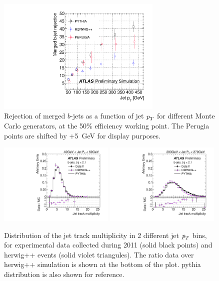 \begin{figure}[tp]
\centering
\includegraphics[width=0.7\textwidth]{gbbRejection_vs_PT_3MonteCarlos_50Eff_shift5.pdf}
\caption{Rejection of merged $b$-jets as a function of jet ${\emph{p}_{T}}$ for different Monte Carlo generators, at the 50\% efficiency working point. The Perugia points are shifted by $+$5~GeV for display purposes.}
\label{fig:performanceotherMC}
\end{figure}

\begin{figure}[tp]
\centering
\includegraphics[width=0.49\textwidth]{FIGS/systematics/DataVarNtrkPT040.pdf}
\includegraphics[width=0.49\textwidth]{FIGS/systematics/DataVarNtrkPT200.pdf}
\caption{Distribution of the jet track multiplicity in 2 different jet ${\emph{p}_{T}}$ bins, for experimental data  collected during 2011 (solid black points) and {\sc herwig}++ events (solid violet triangules). The ratio data over {\sc herwig}++ simulation is shown at the bottom of the plot. {\sc pythia} distribution is also shown for reference.}
\label{fig:herwigdatamc}
\end{figure}



